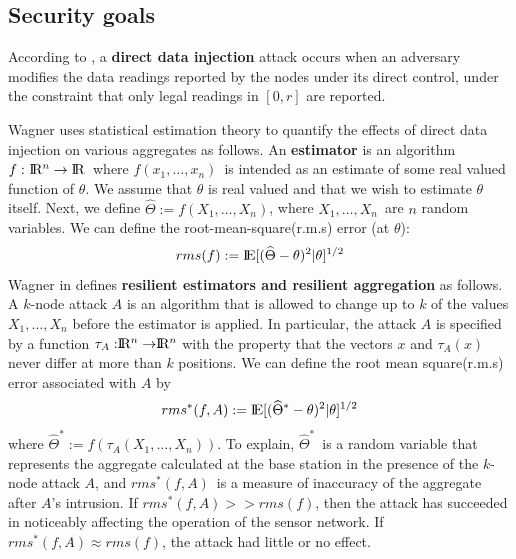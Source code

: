 	\subsection{Security goals}
	\begin{definition}
		\label{def:direct-data-injection}
		According to \cite{chan2006secure}, a \textbf{direct data injection} attack occurs when an adversary modifies the data readings reported by the nodes under its direct control, under the constraint that only legal readings in $[0, r]$ are reported.
	\end{definition}

	Wagner \cite{wagner2004resilient} uses statistical estimation theory to quantify the effects of direct data injection on various aggregates as follows.
	An \textbf{estimator} is an algorithm $ f :\ \R^n \rightarrow \rm I\!R$\ where $f(x_{1},\dotsc, x_{n})$\ is intended as an estimate of some real valued function of $\theta$.
	We assume that $\theta$ is real valued and that we wish to estimate $\theta$ itself.
	Next, we define $\widehat{\Theta} := f(X_{1},\dotsc,X_{n})$, where $X_{1},\dotsc,X_{n}$\ are $n$ random variables. We can define the root-mean-square(r.m.s)  error (at $\theta$):
	\begin{equation}
		rms(f) := \rm I\!E[(\widehat{\Theta} - \theta)^2 | \theta]^{1/2}
	\end{equation}
	Wagner in \cite{wagner2004resilient} defines \textbf{resilient estimators and resilient aggregation } as follows.
	A $k$-node attack $A$ is an algorithm that is allowed to change up to $k$ of the values $X_{1}, \dotsc, X_{n}$ before the estimator is applied.
	In particular, the attack $A$ is specified by a function $\tau_{A} : \R^n \rightarrow  \R^n $ with the property that the vectors $x$ and $\tau_{A}(x)$ never differ at more than $k$ positions.
	We can define the root mean square(r.m.s) error associated with $A$ by
	\begin{equation}
		rms^*(f,A) := \rm I\!E[(\widehat{\Theta}^* - \theta)^2 | \theta]^{1/2} 		  
	\end{equation}
	where $\widehat{\Theta}^* := f(\tau_{A}(X_{1},\dotsc,X_{n}))$.
	To explain, $\widehat{\Theta}^*$\ is a random variable that represents the aggregate calculated at the base station in the presence of the $k$-node attack $A$, and $rms^*(f,A)$\ is a measure of inaccuracy of the aggregate after $A$'s intrusion.
	If $rms^*(f,A) >> rms(f)$, then the attack has succeeded in noticeably affecting the operation of the sensor network.
	If $rms^*(f,A) \approx rms(f)$, the attack had little or no effect.
